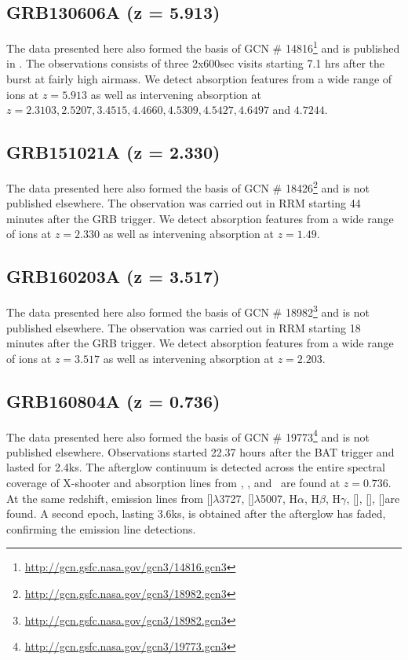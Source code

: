 \documentclass[iop, twocolappendix, numberedappendix, tighten, appendixfloats]{emulateapj}
\newcommand{\hb}{H$\beta$}
\newcommand{\ha}{H$\alpha$}
\newcommand{\hg}{H$\gamma$}
\newcommand{\sii}{[\ion{S}{2}]}
\newcommand{\siii}{[\ion{S}{3}]}
\newcommand{\oii}{[\ion{O}{2}]$\lambda$3727}
\newcommand{\oiii}{[\ion{O}{3}]$\lambda$5007}
\newcommand{\nii}{[\ion{N}{2}]}
\newcommand{\feii}{\ion{Fe}{2}}
\newcommand{\mgi}{\ion{Mg}{1}}
\newcommand{\mgii}{\ion{Mg}{2}}
\newcommand{\alii}{\ion{Al}{2}}
\begin{document}
	\subsection{GRB130606A (z = 5.913)}
	The data presented here also formed the basis of GCN \#
	14816\footnote{\url{http://gcn.gsfc.nasa.gov/gcn3/14816.gcn3}} and is published
	in \citet{Hartoog2015}. The observations consists of three 2x600sec visits
	starting 7.1 hrs after the burst at fairly high airmass. We detect absorption
	features from a wide range of ions at $z=5.913$ as well as intervening
	absorption at $z=2.3103, 2.5207, 3.4515, 4.4660, 4.5309, 4.5427, 4.6497 $ and $
	4.7244$.

	\subsection{GRB151021A (z = 2.330)}
	The data presented here also formed the basis of GCN \#
	18426\footnote{\url{http://gcn.gsfc.nasa.gov/gcn3/18982.gcn3}} and is not
	published elsewhere. The observation was carried out in RRM starting 44 minutes
	after the GRB trigger. We detect absorption features from a wide range of ions
	at $z=2.330$ as well as intervening absorption at $z=1.49$.

	\subsection{GRB160203A (z = 3.517)}
	The data presented here also formed the basis of GCN \#
	18982\footnote{\url{http://gcn.gsfc.nasa.gov/gcn3/18982.gcn3}} and is not
	published elsewhere. The observation was carried out in RRM starting 18 minutes
	after the GRB trigger. We detect absorption features from a wide range of ions
	at $z=3.517$ as well as intervening absorption at $z=2.203$.

	\subsection{GRB160804A (z = 0.736)}
	The data presented here also formed the basis of GCN \#
	19773\footnote{\url{http://gcn.gsfc.nasa.gov/gcn3/19773.gcn3}} and is not
	published elsewhere. Observations started 22.37 hours after the BAT trigger and
	lasted for 2.4ks. The afterglow continuum is detected across the entire
	spectral coverage of X-shooter and absorption lines from \mgi, \mgii, \feii and
	\alii~are found at $z = 0.736$. At the same redshift, emission lines from \oii,
	\oiii, \ha, \hb, \hg, \nii, \sii, \siii are found. A second epoch, lasting
	3.6ks, is obtained after the afterglow has faded, confirming the emission line
	detections.
	
\end{document}
